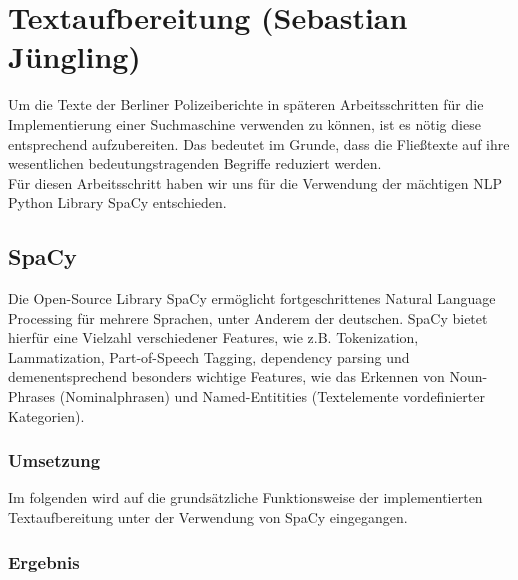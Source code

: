 \chapter{Textaufbereitung (Sebastian Jüngling)}

Um die Texte der Berliner Polizeiberichte in späteren Arbeitsschritten für die Implementierung einer Suchmaschine verwenden zu können, ist es nötig diese entsprechend aufzubereiten. Das bedeutet im Grunde, dass die Fließtexte auf ihre wesentlichen bedeutungstragenden Begriffe reduziert werden. 
\\Für diesen Arbeitsschritt haben wir uns für die Verwendung der mächtigen NLP Python Library SpaCy entschieden. 

\section{SpaCy}
Die Open-Source Library SpaCy ermöglicht fortgeschrittenes Natural Language Processing für mehrere Sprachen, unter Anderem der deutschen. SpaCy bietet hierfür eine Vielzahl verschiedener Features, wie z.B. Tokenization, Lammatization, Part-of-Speech Tagging, dependency parsing und demenentsprechend besonders wichtige Features, wie das Erkennen von Noun-Phrases (Nominalphrasen) und Named-Entitities (Textelemente vordefinierter Kategorien). 

\subsection{Umsetzung}
Im folgenden wird auf die grundsätzliche Funktionsweise der implementierten Textaufbereitung unter der Verwendung von SpaCy eingegangen.

\subsection{Ergebnis}





